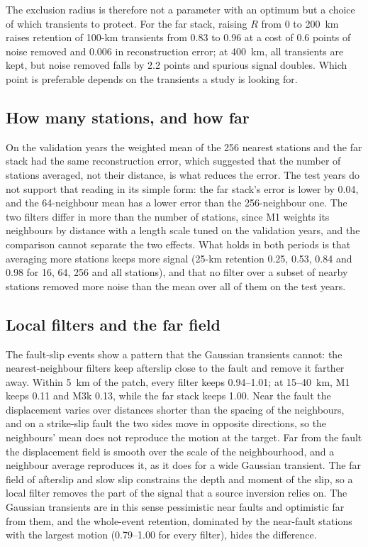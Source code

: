 The exclusion radius is therefore not a parameter with an optimum but a choice of which transients to protect. For the far stack, raising $R$ from 0 to 200~km raises retention of 100-km transients from 0.83 to 0.96 at a cost of 0.6 points of noise removed and 0.006 in reconstruction error; at 400~km, all transients are kept, but noise removed falls by 2.2 points and spurious signal doubles. Which point is preferable depends on the transients a study is looking for.

\subsection{How many stations, and how far}

On the validation years the weighted mean of the 256 nearest stations and the far stack had the same reconstruction error, which suggested that the number of stations averaged, not their distance, is what reduces the error. The test years do not support that reading in its simple form: the far stack's error is lower by 0.04, and the 64-neighbour mean has a lower error than the 256-neighbour one. The two filters differ in more than the number of stations, since M1 weights its neighbours by distance with a length scale tuned on the validation years, and the comparison cannot separate the two effects. What holds in both periods is that averaging more stations keeps more signal (25-km retention 0.25, 0.53, 0.84 and 0.98 for 16, 64, 256 and all stations), and that no filter over a subset of nearby stations removed more noise than the mean over all of them on the test years.

\subsection{Local filters and the far field}

The fault-slip events show a pattern that the Gaussian transients cannot: the nearest-neighbour filters keep afterslip close to the fault and remove it farther away. Within 5~km of the patch, every filter keeps 0.94--1.01; at 15--40~km, M1 keeps 0.11 and M3k 0.13, while the far stack keeps 1.00. Near the fault the displacement varies over distances shorter than the spacing of the neighbours, and on a strike-slip fault the two sides move in opposite directions, so the neighbours' mean does not reproduce the motion at the target. Far from the fault the displacement field is smooth over the scale of the neighbourhood, and a neighbour average reproduces it, as it does for a wide Gaussian transient. The far field of afterslip and slow slip constrains the depth and moment of the slip, so a local filter removes the part of the signal that a source inversion relies on. The Gaussian transients are in this sense pessimistic near faults and optimistic far from them, and the whole-event retention, dominated by the near-fault stations with the largest motion (0.79--1.00 for every filter), hides the difference.


